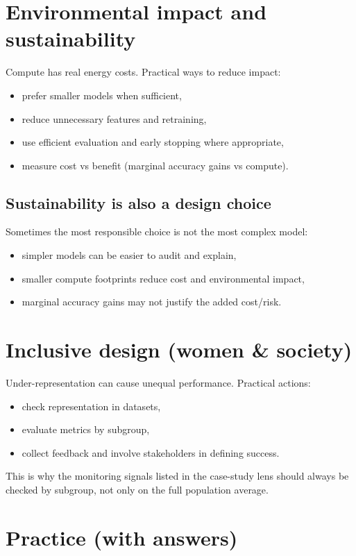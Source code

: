 \documentclass[11pt]{article}
\begin{document}
\section{Environmental impact and sustainability}
Compute has real energy costs. Practical ways to reduce impact:
\begin{itemize}[leftmargin=*]
  \item prefer smaller models when sufficient,
  \item reduce unnecessary features and retraining,
  \item use efficient evaluation and early stopping where appropriate,
  \item measure cost vs benefit (marginal accuracy gains vs compute).
\end{itemize}

\subsection{Sustainability is also a design choice}
Sometimes the most responsible choice is not the most complex model:
\begin{itemize}[leftmargin=*]
  \item simpler models can be easier to audit and explain,
  \item smaller compute footprints reduce cost and environmental impact,
  \item marginal accuracy gains may not justify the added cost/risk.
\end{itemize}

\section{Inclusive design (women \& society)}
Under-representation can cause unequal performance. Practical actions:
\begin{itemize}[leftmargin=*]
  \item check representation in datasets,
  \item evaluate metrics by subgroup,
  \item collect feedback and involve stakeholders in defining success.
\end{itemize}
This is why the monitoring signals listed in the case-study lens should always be checked by subgroup, not only on the full population average.

\section{Practice (with answers)}
\end{document}
